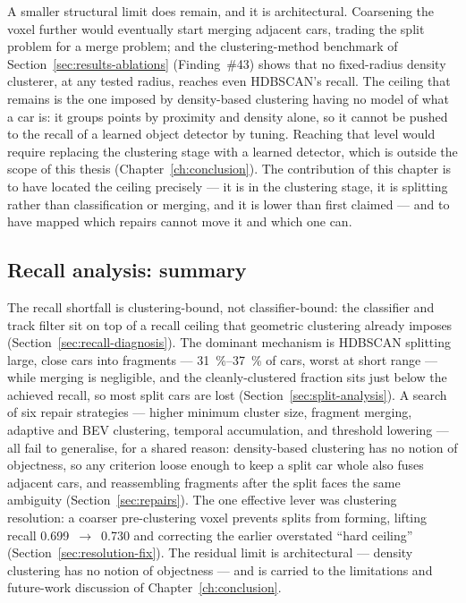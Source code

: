 A smaller structural limit does remain, and it is architectural. Coarsening the voxel
further would eventually start merging adjacent cars, trading the split problem for a
merge problem; and the clustering-method benchmark of Section~\ref{sec:results-ablations} (Finding~\#43)
shows that no fixed-radius density clusterer, at any tested radius, reaches even
HDBSCAN's recall. The ceiling that remains is the one imposed by density-based
clustering having no model of what a car is: it groups points by proximity and
density alone, so it cannot be pushed to the recall of a learned object detector by
tuning. Reaching that level would require replacing the clustering stage with a
learned detector, which is outside the scope of this thesis (Chapter~\ref{ch:conclusion}). The
contribution of this chapter is to have located the ceiling precisely --- it is in
the clustering stage, it is splitting rather than classification or merging, and it
is lower than first claimed --- and to have mapped which repairs cannot move it and
which one can.

\subsection{Recall analysis: summary}
\label{sec:recall-summary}

The recall shortfall is clustering-bound, not classifier-bound: the classifier and
track filter sit on top of a recall ceiling that geometric clustering already imposes
(Section~\ref{sec:recall-diagnosis}). The dominant mechanism is HDBSCAN splitting
large, close cars into fragments --- \SIrange{31}{37}{\percent} of cars, worst at
short range --- while merging is negligible, and the cleanly-clustered fraction sits
just below the achieved recall, so most split cars are lost
(Section~\ref{sec:split-analysis}). A search of six repair strategies --- higher
minimum cluster size, fragment merging, adaptive and BEV clustering, temporal
accumulation, and threshold lowering --- all fail to generalise, for a shared reason:
density-based clustering has no notion of objectness, so any criterion loose enough to
keep a split car whole also fuses adjacent cars, and reassembling fragments after the
split faces the same ambiguity (Section~\ref{sec:repairs}). The one effective lever was clustering
resolution: a coarser pre-clustering voxel prevents splits from forming, lifting
recall \num{0.699}~$\rightarrow$~\num{0.730} and correcting the earlier overstated
``hard ceiling'' (Section~\ref{sec:resolution-fix}). The residual limit is
architectural --- density clustering has no notion of objectness --- and is carried
to the limitations and future-work discussion of Chapter~\ref{ch:conclusion}.
